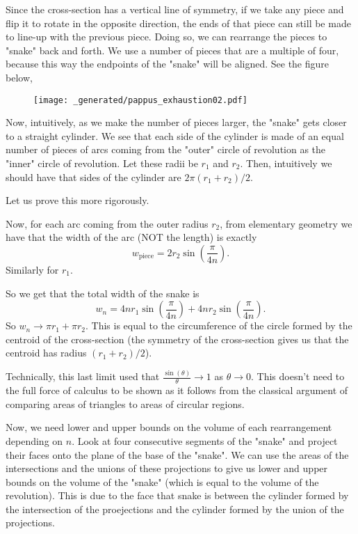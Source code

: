 Since the cross-section has a vertical line of symmetry, if we take any piece and flip it to
rotate in the opposite direction, the ends of that piece can still be made to line-up with the
previous piece. Doing so, we can rearrange the pieces to "snake" back and forth. We use a number
of pieces that are a multiple of four, because this way the endpoints of the "snake" will be
aligned. See the figure below,

\begin{figure}[h]
\centering
\texttt{[image: \_generated/pappus\_exhaustion02.pdf]}
\end{figure} 

Now, intuitively, as we make the number of pieces larger, the "snake" gets closer to a straight
cylinder. We see that each side of the cylinder is made of an equal number of pieces of arcs
coming from the "outer" circle of revolution as the "inner" circle of revolution. Let these
radii be \(r_1\) and \(r_2\). Then, intuitively we should have that sides of the cylinder are
\(2\pi(r_1 + r_2)/2\).

Let us prove this more rigorously.

Now, for each arc coming from the outer radius \(r_2\), from elementary geometry we have that the
width of the arc (NOT the length) is exactly
\begin{equation}
w_{\text{piece}} = 2r_2\sin\left(\frac{\pi}{4n}\right).
\end{equation}
Similarly for \(r_1\).

So we get that the total width of the snake is
\begin{equation}
w_n = 4n r_1 \sin\left(\frac{\pi}{4n}\right) + 4n r_2 \sin\left(\frac{\pi}{4n}\right).
\end{equation}
So \(w_n \to \pi r_1 + \pi r_2\). This is equal to the circumference of the circle formed by the
centroid of the cross-section (the symmetry of the cross-section gives us that the centroid has
radius \((r_1 + r_2)/2\)).

Technically, this last limit used that \(\frac{\sin(\theta)}{\theta} \to 1\) as \(\theta \to 0\).
This doesn't need to the full force of calculus to be shown as it follows from the classical
argument of comparing areas of triangles to areas of circular regions.

Now, we need lower and upper bounds on the volume of each rearrangement depending on \(n\). Look
at four consecutive segments of the "snake" and project their faces onto the plane of the base of
the "snake". We can use the areas of the intersections and the unions of these projections to give
us lower and upper bounds on the volume of the "snake" (which is equal to the volume of the
revolution). This is due to the face that snake is between the cylinder formed by the intersection
of the proejections and the cylinder formed by the union of the projections.

